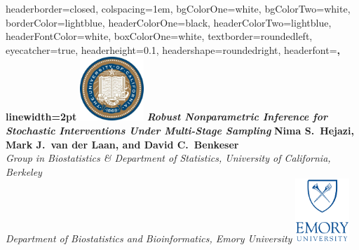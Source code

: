 \documentclass[landscape,a0paper,fontscale=0.285]{baposter} %
\begin{document}
\begin{poster} {
headerborder=closed, %
colspacing=1em, %
bgColorOne=white, %
bgColorTwo=white, %
borderColor=lightblue, %
headerColorOne=black, %
headerColorTwo=lightblue, %
headerFontColor=white, %
boxColorOne=white, %
textborder=roundedleft, %
eyecatcher=true, %
headerheight=0.1\textheight, %
headershape=roundedright, %
headerfont=\Large\bf\textsc, %
linewidth=2pt %
}
%
{\includegraphics[height=6.5em]{logo_berkeley.jpg}} %
{\bf\textit{\LARGE Robust Nonparametric Inference for Stochastic Interventions
    Under Multi-Stage Sampling}\vspace{0.01em}} %
{\textbf{Nima S.~Hejazi, Mark J.~van der Laan, and David C.~Benkeser} \\
  \textit{Group in Biostatistics \& Department of Statistics, University of
    California, Berkeley} \\
  \textit{Department of Biostatistics and Bioinformatics, Emory University}}
{\includegraphics[height=6.5em]{logo_emory.jpg}} %


\end{poster}
\end{document}
